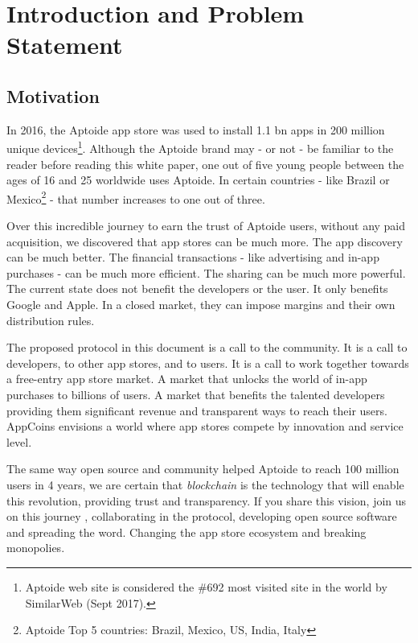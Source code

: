 \section{Introduction and Problem Statement}
\label{sec: introduction}

\subsection{Motivation}

In 2016, the Aptoide app store was used to install 1.1 bn apps in 200 million unique devices\footnote{Aptoide web site is considered the \#692 most visited site in the world by SimilarWeb (Sept 2017).}. Although the Aptoide brand may - or not - be familiar to the reader before reading this white paper, one out of five young people between the ages of 16 and 25 worldwide uses Aptoide. In certain countries - like Brazil or Mexico\footnote{Aptoide Top 5 countries: Brazil, Mexico, US, India, Italy} - that number increases to one out of three.

\medskip

Over this incredible journey to earn the trust of Aptoide users, without any paid acquisition, we discovered that app stores can be much more. The app discovery can be much better. The financial transactions - like advertising and in-app purchases - can be much more efficient. The sharing can be much more powerful. The current state does not benefit the developers or the user. It only benefits Google and Apple. In a closed market, they can impose margins and their own distribution rules.

\medskip

The proposed protocol in this document is a call to the community. It is a call to developers, to other app stores, and to users. It is a call to work together towards a free-entry app store market. A market that unlocks the world of in-app purchases to billions of users. A market that benefits the talented developers providing them significant revenue and transparent ways to reach their users. AppCoins envisions a world where app stores compete by innovation and service level.

\medskip

The same way open source and community helped Aptoide to reach 100 million users in 4 years, we are certain that {\em blockchain} is the technology that will enable this revolution, providing trust and transparency. If you share this vision, join us on this journey \cite{lucas}, collaborating in the protocol, developing open source software and spreading the word. Changing the app store ecosystem and breaking monopolies.

